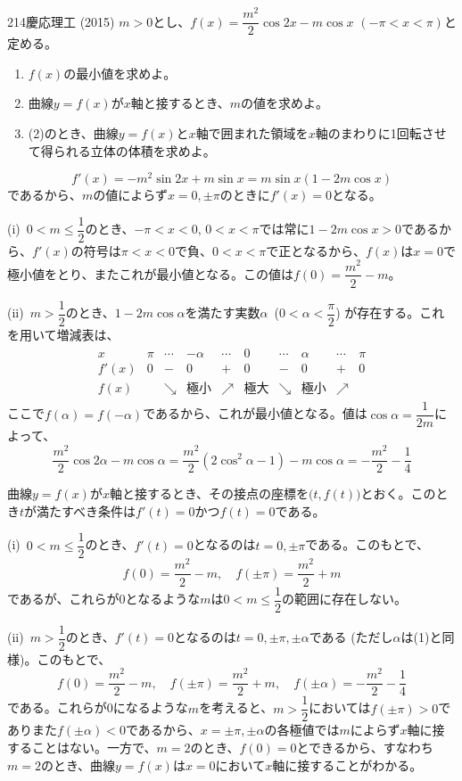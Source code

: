 \begin{thm}{214}{}{慶応理工 (2015)}
 $m>0$とし、$f(x)=\dfrac{m^2}{2}\cos 2x-m\cos x$ $(-\pi<x<\pi)$と定める。
 \begin{enumerate}
  \item $f(x)$の最小値を求めよ。
  \item 曲線$y=f(x)$が$x$軸と接するとき、$m$の値を求めよ。
  \item (2)のとき、曲線$y=f(x)$と$x$軸で囲まれた領域を$x$軸のまわりに1回転させて得られる立体の体積を求めよ。
 \end{enumerate}
\end{thm}

\[ f'(x)=-m^2\sin 2x+m\sin x=m\sin x(1-2m\cos x) \]
であるから、$m$の値によらず$x=0, \pm\pi$のときに$f'(x)=0$となる。

(i)~$0<m\le \dfrac{1}{2}$のとき、$-\pi<x<0$, $0<x<\pi$では常に$1-2m\cos x>0$であるから、$f'(x)$の符号は$\pi<x<0$で負、$0<x<\pi$で正となるから、$f(x)$は$x=0$で極小値をとり、またこれが最小値となる。この値は$f(0)=\dfrac{m^2}{2}-m$。

(ii)~$m>\dfrac{1}{2}$のとき、$1-2m\cos\alpha$を満たす実数$\alpha$~($0<\alpha<\dfrac{\pi}{2}$) が存在する。これを用いて増減表は、
\begin{align*}
 \begin{array}{c|c|c|c|c|c|c|c|c|c}
  x& \pi & \cdots & -\alpha & \cdots & 0 & \cdots & \alpha & \cdots & \pi \\ \hline
  f'(x) & 0 & - & 0 & + & 0 & - & 0 & + & 0 \\ \hline
  f(x) & & \searrow & \text{極小} & \nearrow & \text{極大} & \searrow & \text{極小} & \nearrow & 
 \end{array}
\end{align*}
ここで$f(\alpha)=f(-\alpha)$であるから、これが最小値となる。値は$\cos\alpha=\dfrac{1}{2m}$によって、
\[ \frac{m^2}{2}\cos 2\alpha-m\cos\alpha=\frac{m^2}{2}(2\cos^2\alpha-1)-m\cos\alpha=-\frac{m^2}{2}-\frac{1}{4} \]

曲線$y=f(x)$が$x$軸と接するとき、その接点の座標を$\bigl(t, f(t)\bigr)$とおく。このとき$t$が満たすべき条件は$f'(t)=0$かつ$f(t)=0$である。

(i)~$0<m\le \dfrac{1}{2}$のとき、$f'(t)=0$となるのは$t=0, \pm\pi$である。このもとで、
\[ f(0)=\frac{m^2}{2}-m,\quad f(\pm\pi)=\frac{m^2}{2}+m \]
であるが、これらが0となるような$m$は$0<m\le\dfrac{1}{2}$の範囲に存在しない。

(ii)~$m>\dfrac{1}{2}$のとき、$f'(t)=0$となるのは$t=0, \pm\pi, \pm\alpha$である (ただし$\alpha$は(1)と同様)。このもとで、
\[ f(0)=\frac{m^2}{2}-m,\quad f(\pm\pi)=\frac{m^2}{2}+m,\quad f(\pm\alpha)=-\frac{m^2}{2}-\frac{1}{4} \]
である。これらが0になるような$m$を考えると、$m>\dfrac{1}{2}$においては$f(\pm\pi)>0$でありまた$f(\pm\alpha)<0$であるから、$x=\pm\pi, \pm\alpha$の各極値では$m$によらず$x$軸に接することはない。一方で、$m=2$のとき、$f(0)=0$とできるから、すなわち$m=2$のとき、曲線$y=f(x)$は$x=0$において$x$軸に接することがわかる。

